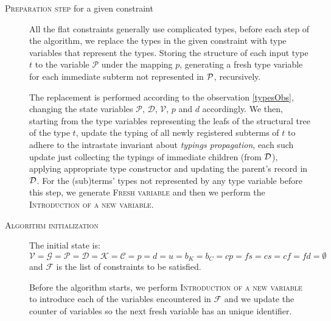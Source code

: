 \begin{description}
    \item[\textsc{Preparation step} for a given constraint] All the flat constraints generally use complicated types, before each step of the algorithm, we replace the types in the given constraint with type variables that represent the types. Storing the structure of each input type $t$ to the variable $\mathcal P$ under the mapping $p$, generating a fresh type variable for each immediate subterm not represented in $\mathcal P$, recursively.

    The replacement is performed according to the observation \ref{typesObs}, changing the state variables $\mathcal{P}$, $\mathcal{D}$, $\mathcal{V}$, $p$ and $d$ accordingly. We then, starting from the type variables representing the leafs of the structural tree of the type $t$, update the typing of all newly registered subterms of $t$ to adhere to the intrastate invariant about \emph{typings propagation}, each such update just collecting the typings of immediate children (from $\mathcal D$), applying appropriate type constructor and updating the parent's record in $\mathcal D$. For the (sub)terms' types not represented by any type variable before this step, we generate \textsc{Fresh variable} and then we perform the \textsc{Introduction of a new variable}.

    \item[\textsc{Algorithm initialization}] The initial state is: $\mathcal{V} = \mathcal{G} = \mathcal{P} = \mathcal{D} = \mathcal{K} = \mathcal{C} = p = d = u = b_K = b_C = cp = fs = cs = cf = fd = \emptyset$ and $\mathcal{F}$ is the list of constraints to be satisfied.

    Before the algorithm starts, we perform \textsc{Introduction of a new variable} to introduce each of the variables encountered in $\mathcal{F}$ and we update the counter of variables so the next fresh variable has an unique identifier.
\end{description}



